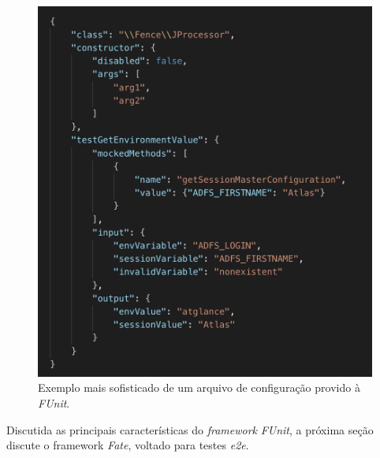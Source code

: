 \begin{figure}[H]
    \centering
    \includegraphics[width=13cm]{source/4-solucao/images/funcionalidades-add.png}
    \caption{Exemplo mais sofisticado de um arquivo de configuração provido à \emph{FUnit}.}
    \label{fig:funcionalidades-add}
\end{figure}

Discutida as principais características do \emph{framework} \emph{FUnit}, a próxima seção discute o framework \emph{Fate}, voltado para testes \emph{e2e}.
